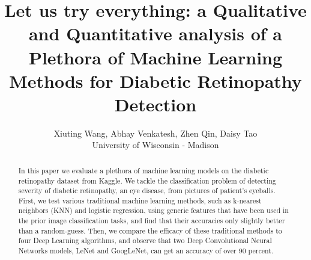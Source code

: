 \documentclass[letterpaper]{article} %
\begin{document}
%
\title{Let us try everything: a Qualitative and Quantitative analysis of a Plethora of Machine Learning Methods for Diabetic Retinopathy Detection}
\author{Xiuting Wang, Abhay Venkatesh, Zhen Qin, Daisy Tao\\
University of Wisconsin - Madison\\
}


\maketitle

\begin{abstract}
In this paper we evaluate a plethora of machine learning
models on the diabetic retinopathy dataset from Kaggle. We
tackle the classification problem of detecting severity of diabetic
retinopathy, an eye disease, from pictures of patient’s
eyeballs. First, we test various traditional machine learning
methods, such as k-nearest neighbors (KNN) and logistic regression,
using generic features that have been used in the prior
image classification tasks, and find that their accuracies only slightly better than a random-guess. Then, we compare
the efficacy of these traditional methods to four Deep
Learning algorithms, and observe that two Deep Convolutional Neural
Networks models, LeNet  and GoogLeNet, can get an accuracy of over 90 percent.  

\end{abstract}
















\end{document}
